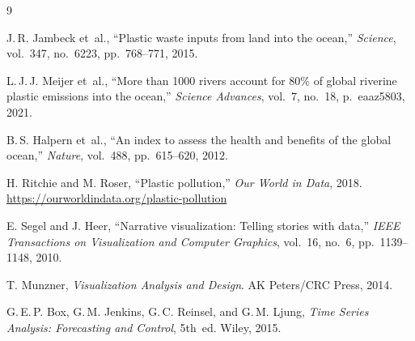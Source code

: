 \documentclass[10pt,twocolumn]{article}
\begin{document}
{\small
\begin{thebibliography}{9}

J.\,R. Jambeck et~al.,
``Plastic waste inputs from land into the ocean,''
\textit{Science}, vol.~347, no.~6223, pp.~768--771, 2015.

L.\,J.\,J. Meijer et~al.,
``More than 1000 rivers account for 80\% of global riverine plastic emissions
into the ocean,''
\textit{Science Advances}, vol.~7, no.~18, p.~eaaz5803, 2021.

B.\,S. Halpern et~al.,
``An index to assess the health and benefits of the global ocean,''
\textit{Nature}, vol.~488, pp.~615--620, 2012.

H. Ritchie and M. Roser,
``Plastic pollution,''
\textit{Our World in Data}, 2018.
\url{https://ourworldindata.org/plastic-pollution}

E. Segel and J. Heer,
``Narrative visualization: Telling stories with data,''
\textit{IEEE Transactions on Visualization and Computer Graphics},
vol.~16, no.~6, pp.~1139--1148, 2010.

T. Munzner,
\textit{Visualization Analysis and Design}.
AK Peters/CRC Press, 2014.

G.\,E.\,P. Box, G.\,M. Jenkins, G.\,C. Reinsel, and G.\,M. Ljung,
\textit{Time Series Analysis: Forecasting and Control}, 5th~ed.
Wiley, 2015.

\end{thebibliography}
}
\end{document}
